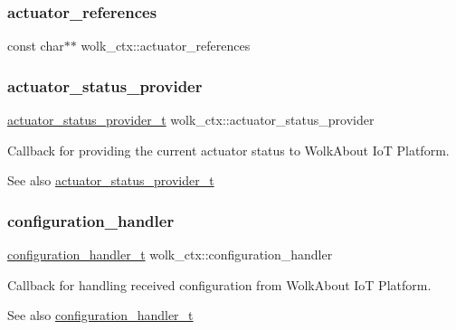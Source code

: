\subsubsection{\texorpdfstring{actuator\+\_\+references}{actuator\_references}}
{\footnotesize\ttfamily const char$\ast$$\ast$ wolk\+\_\+ctx\+::actuator\+\_\+references}

\mbox{\label{structwolk__ctx_aee7f3ef8dbcfd4f8a3817ef26a1629f6}} 
\subsubsection{\texorpdfstring{actuator\+\_\+status\+\_\+provider}{actuator\_status\_provider}}
{\footnotesize\ttfamily \hyperlink{wolk__connector_8h_af3e8919a04a293972b64605557287537}{actuator\+\_\+status\+\_\+provider\+\_\+t} wolk\+\_\+ctx\+::actuator\+\_\+status\+\_\+provider}

Callback for providing the current actuator status to Wolk\+About IoT Platform. \begin{DoxySeeAlso}{See also}
\hyperlink{wolk__connector_8h_af3e8919a04a293972b64605557287537}{actuator\+\_\+status\+\_\+provider\+\_\+t} 
\end{DoxySeeAlso}
\mbox{\label{structwolk__ctx_a6c0926345d1d56f8fbd3cb50d8f4a804}} 
\subsubsection{\texorpdfstring{configuration\+\_\+handler}{configuration\_handler}}
{\footnotesize\ttfamily \hyperlink{wolk__connector_8h_a6662d0d41546795466cc2b398d8dcb08}{configuration\+\_\+handler\+\_\+t} wolk\+\_\+ctx\+::configuration\+\_\+handler}

Callback for handling received configuration from Wolk\+About IoT Platform. \begin{DoxySeeAlso}{See also}
\hyperlink{wolk__connector_8h_a6662d0d41546795466cc2b398d8dcb08}{configuration\+\_\+handler\+\_\+t} 
\end{DoxySeeAlso}
\mbox{\label{structwolk__ctx_a982fc36741a8c8cfb5ad3939363cebf8}} 

